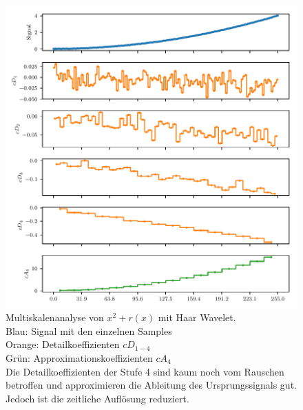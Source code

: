 \begin{refsection}
\begin{figure}
\centering
\includegraphics{papers/polynomials/images/polynomials_noise_db1_multi.pdf}
\caption{Multiskalenanalyse von $x^2 + r(x)$ mit Haar Wavelet.\\
Blau: Signal mit den einzelnen Samples\\
Orange: Detailkoeffizienten $cD_{1-4}$ \\
Grün: Approximationskoeffizienten $cA_4$\\
Die Detailkoeffizienten der Stufe 4 sind kaum noch vom Rauschen
betroffen und approximieren die Ableitung des Ursprungssignals gut.
Jedoch ist die zeitliche Auflösung reduziert.\label{polynomials:noise:db1_multi}}
\end{figure}
\begin{figure}
\centering

\end{figure}
\end{refsection}
